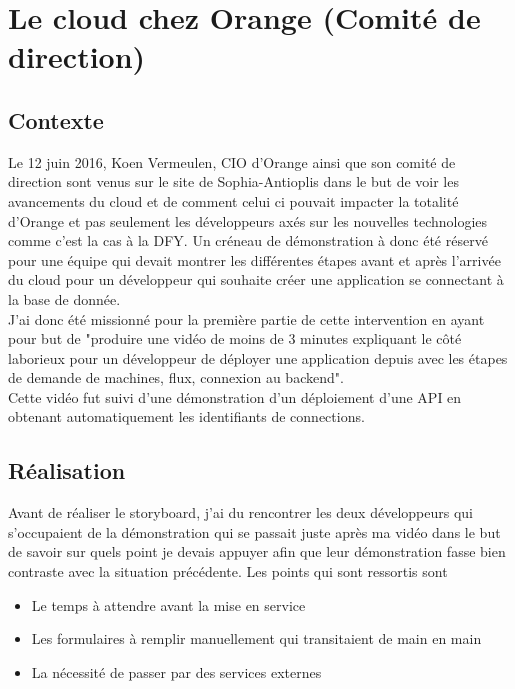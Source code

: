 \section{Le cloud chez Orange (Comité de direction)}
\subsection{Contexte}
Le 12 juin 2016, Koen Vermeulen, CIO d'Orange ainsi que son comité de direction sont venus sur le site de Sophia-Antioplis dans le but de voir les avancements du cloud et de comment celui ci pouvait impacter la totalité d'Orange et pas seulement les développeurs axés sur les nouvelles technologies comme c'est la cas à la DFY. Un créneau de démonstration à donc été réservé pour une équipe qui devait montrer les différentes étapes avant et après l'arrivée du cloud pour un développeur qui souhaite créer une application se connectant à la base de donnée.\\

J'ai donc été missionné pour la première partie de cette intervention en ayant pour but de "produire une vidéo de moins de 3 minutes expliquant le côté laborieux pour un développeur de déployer une application depuis avec les étapes de demande de machines, flux, connexion au backend".\\

Cette vidéo fut suivi d'une démonstration d'un déploiement d'une API en obtenant automatiquement les identifiants de connections.

\subsection{Réalisation}
Avant de réaliser le storyboard, j'ai du rencontrer les deux développeurs qui s'occupaient de la démonstration qui se passait juste après ma vidéo dans le but de savoir sur quels point je devais appuyer afin que leur démonstration fasse bien contraste avec la situation précédente. Les points qui sont ressortis sont

\begin{itemize}
    \item Le temps à attendre avant la mise en service
    \item Les formulaires à remplir manuellement qui transitaient de main en main
    \item La nécessité de passer par des services externes
\end{itemize}

